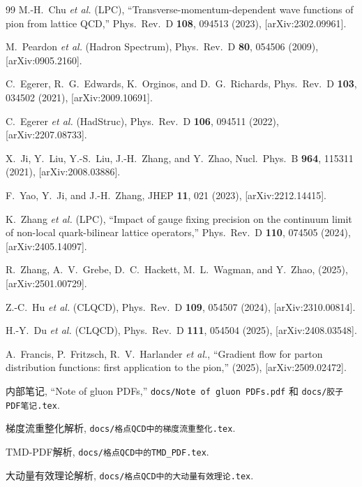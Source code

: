 \documentclass[12pt,a4paper]{ctexart}
\theoremstyle{definition}
\begin{document}
\begin{thebibliography}{99}
M.-H.~Chu \textit{et al.} (LPC),
``Transverse-momentum-dependent wave functions of pion from lattice QCD,''
Phys.\ Rev.\ D \textbf{108}, 094513 (2023), [arXiv:2302.09961].

M.~Peardon \textit{et al.} (Hadron Spectrum),
Phys.\ Rev.\ D \textbf{80}, 054506 (2009), [arXiv:0905.2160].

C.~Egerer, R.~G.~Edwards, K.~Orginos, and D.~G.~Richards,
Phys.\ Rev.\ D \textbf{103}, 034502 (2021), [arXiv:2009.10691].

C.~Egerer \textit{et al.} (HadStruc),
Phys.\ Rev.\ D \textbf{106}, 094511 (2022), [arXiv:2207.08733].

X.~Ji, Y.~Liu, Y.-S.~Liu, J.-H.~Zhang, and Y.~Zhao,
Nucl.\ Phys.\ B \textbf{964}, 115311 (2021), [arXiv:2008.03886].

F.~Yao, Y.~Ji, and J.-H.~Zhang,
JHEP \textbf{11}, 021 (2023), [arXiv:2212.14415].

K.~Zhang \textit{et al.} (LPC),
``Impact of gauge fixing precision on the continuum limit of non-local quark-bilinear lattice operators,''
Phys.\ Rev.\ D \textbf{110}, 074505 (2024), [arXiv:2405.14097].

R.~Zhang, A.~V.~Grebe, D.~C.~Hackett, M.~L.~Wagman, and Y.~Zhao,
(2025), [arXiv:2501.00729].

Z.-C.~Hu \textit{et al.} (CLQCD),
Phys.\ Rev.\ D \textbf{109}, 054507 (2024), [arXiv:2310.00814].

H.-Y.~Du \textit{et al.} (CLQCD),
Phys.\ Rev.\ D \textbf{111}, 054504 (2025), [arXiv:2408.03548].

A.~Francis, P.~Fritzsch, R.~V.~Harlander \textit{et al.},
``Gradient flow for parton distribution functions: first application to the pion,''
(2025), [arXiv:2509.02472].


内部笔记, ``Note of gluon PDFs,''
\texttt{docs/Note of gluon PDFs.pdf} 和 \texttt{docs/胶子PDF笔记.tex}.

梯度流重整化解析,
\texttt{docs/格点QCD中的梯度流重整化.tex}.

TMD-PDF解析,
\texttt{docs/格点QCD中的TMD\_PDF.tex}.

大动量有效理论解析,
\texttt{docs/格点QCD中的大动量有效理论.tex}.


\end{thebibliography}
\end{document}
